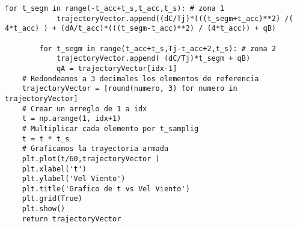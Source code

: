 \begin{lstlisting}[style=pythonstyle, caption={Algoritmo generador de referencias para el controlador PID.}, label=cdg:genTrayectoria, basicstyle=\ttfamily\fontsize{8}{8}\selectfont]
        for t_segm in range(-t_acc+t_s,t_acc,t_s): # zona 1  
            trajectoryVector.append((dC/Tj)*(((t_segm+t_acc)**2) /( 4*t_acc) ) + (dA/t_acc)*(((t_segm-t_acc)**2) / (4*t_acc)) + qB)  
            
        for t_segm in range(t_acc+t_s,Tj-t_acc+2,t_s): # zona 2
            trajectoryVector.append( (dC/Tj)*t_segm + qB)
            qA = trajectoryVector[idx-1]
    # Redondeamos a 3 decimales los elementos de referencia
    trajectoryVector = [round(numero, 3) for numero in trajectoryVector]
    # Crear un arreglo de 1 a idx
    t = np.arange(1, idx+1)
    # Multiplicar cada elemento por t_samplig
    t = t * t_s
    # Graficamos la trayectoria armada
    plt.plot(t/60,trajectoryVector )
    plt.xlabel('t')
    plt.ylabel('Vel Viento')
    plt.title('Grafico de t vs Vel Viento')
    plt.grid(True)
    plt.show()
    return trajectoryVector
\end{lstlisting}
\newpage
